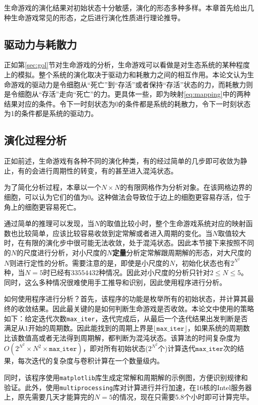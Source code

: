 \documentclass[a4paper,12pt]{article}
\begin{document}
生命游戏的演化结果对初始状态十分敏感，演化的形态多种多样。本章首先给出几种生命游戏常见的形态，之后进行演化性质进行理论推导。

\subsection{驱动力与耗散力}

正如第\ref{sec:gol}节对生命游戏的分析，生命游戏可以看做是对生态系统的某种程度上的模拟。整个系统的演化取决于驱动力和耗散力之间的相互作用。本论文认为生命游戏的驱动力是令细胞从“死亡”到“存活”或者保持“存活”状态的力，而耗散力则是令细胞从“存活”走向“死亡”的力。更具体一些，即为映射\ref{eq:mapping}中的两种结果对应的条件。令下一时刻状态为0的条件都是系统的耗散力，令下一时刻状态为1的条件都是系统的驱动力。

\subsection{演化过程分析}

正如前述，生命游戏有各种不同的演化种类，有的经过简单的几步即可收敛为静止，有的会进行周期性的转变，有的甚至进入混沌状态。

为了简化分析过程，本章以一个$N \times N$的有限网格作为分析对象。在该网格边界的细胞，可以认为它们的值为0。这种做法会导致位于边上的细胞更容易存活，位于角上的细胞更容易死亡。

通过简单的推理可以发现，当$N$的取值比较小时，整个生命游戏系统对应的映射函数也比较简单，应该比较容易收敛到定常解或者进入周期的变化。当$N$取值较大时，在有限的演化步中很可能无法收敛，处于混沌状态。因此本节接下来按照不同的$N$的尺度进行分析，对小尺度的$N$\textbf{定量}分析定常解跟周期解的形态，对大尺度的$N$则进行定性的分析。需要注意的是，即使是小尺度的$N$，初始化状态也有$2^{N^2}$种，当$N=5$时已经有$33554432$种情况。因此对小尺度的分析只针对$2 \leq N \leq 5$。同时，这么多种情况很难使用手工推导和识别，因此使用程序进行分析。

如何使用程序进行分析？首先，该程序的功能是枚举所有的初始状态，并计算其最终的收敛结果。因此最关键的是如何判断生命游戏是否收敛。本论文中使用的策略如下：给定迭代次数\texttt{max\_iter}，迭代完成后，从最后一个迭代结果出发判断是否满足从$1$开始的周期数。因此能找到的周期上界是$\lfloor \mathtt{max\_iter} \rfloor$，如果系统的周期数比该数值高或者无法得到周期解，都判断为混沌状态。该算法的时间复杂度为$O(2^{N^2} \times N^2 \times \mathtt{max\_iter})$，即对所有初始状态($2^{N^2}$个)计算迭代$\mathtt{max\_iter}$次的结果，每次迭代的复杂度与卷积计算在一个数量级内。

同时，该程序使用\texttt{matplotlib}库生成定常解和周期解的示例图，方便识别规律和验证。此外，使用\texttt{multiprocessing}库对计算进行并行加速，在16核的Intel服务器上，原先需要几天才能算完的$N=5$的情况，现在只需要5.8个小时即可计算完毕。
\end{document}
